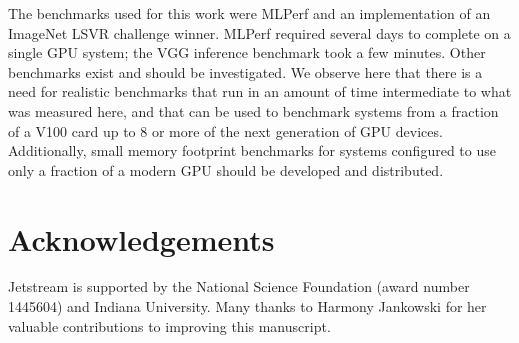 \documentclass[conference]{IEEEtran}
\begin{document}
The benchmarks used for this work were MLPerf and an implementation of an ImageNet LSVR challenge winner. MLPerf required several days to complete on a single GPU system; the VGG inference benchmark took a few minutes. Other benchmarks \cite{bench-design} exist and should be investigated. We observe here that there is a need for realistic benchmarks that run in an amount of time intermediate to what was measured here, and that can be used to benchmark systems from a fraction of a V100 card up to 8 or more of the next generation of GPU devices. Additionally, small memory footprint benchmarks for systems configured to use only a fraction of a modern GPU should be developed and distributed.

\section*{Acknowledgements}
Jetstream is supported by the National Science Foundation (award number 1445604) and Indiana University. Many thanks to Harmony Jankowski for her valuable contributions to improving this manuscript.



\end{document}
